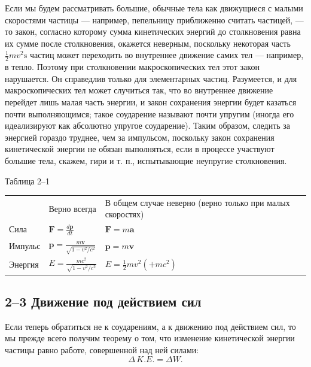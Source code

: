 \documentclass[11pt,oneside]{article}
\providecommand{\ddt}[2]{\frac{d#1}{d#2}}
\providecommand{\FLPF}{\mathbf{F}}
\providecommand{\FLPa}{\mathbf{a}}
\providecommand{\FLPp}{\mathbf{p}}
\providecommand{\FLPv}{\mathbf{v}}
\begin{document}
Если мы будем рассматривать большие, обычные тела как движущиеся с малыми скоростями частицы --- например, пепельницу приближенно считать частицей, --- то закон, согласно которому сумма кинетических энергий до столкновения равна их сумме после столкновения, окажется неверным, поскольку некоторая часть \(\frac12mv^2\text{s}\) частиц может переходить во внутреннее движение самих тел --- например, в тепло. Поэтому при столкновении макроскопических тел этот закон нарушается. Он справедлив только для элементарных частиц. Разумеется, и для макроскопических тел может случиться так, что во внутреннее движение перейдет лишь малая часть энергии, и закон сохранения энергии будет казаться почти выполняющимся; такое соударение называют почти упругим (иногда его идеализируют как абсолютно упругое соударение). Таким образом, следить за энергией гораздо труднее, чем за импульсом, поскольку закон сохранения кинетической энергии не обязан выполняться, если в процессе участвуют большие тела, скажем, гири и т. п., испытывающие неупругие столкновения.\par

\begin{center}
{\small Таблица 2--1}\par\smallskip
\begin{tabular}{lll}
 & Верно всегда & В общем случае неверно (верно только при малых скоростях)\\
Сила & \(\FLPF = \ddt{\FLPp}{t}\) & \(\FLPF = m\FLPa\)\\
Импульс & \(\FLPp = \frac{m\FLPv}{\sqrt{1-v^2/c^2}}\) & \(\FLPp = m\FLPv\)\\
Энергия & \(E = \frac{mc^2}{\sqrt{1-v^2/c^2}}\) & \(E = \frac12mv^2 (+mc^2)\)
\end{tabular}
\end{center}

\subsection*{2--3 Движение под действием сил}

Если теперь обратиться не к соударениям, а к движению под действием сил, то мы прежде всего получим теорему о том, что изменение кинетической энергии частицы равно работе, совершенной над ней силами: 
\begin{equation*} \tag{2.10}
\label{Eq:TIPS:2:10} \Delta\,K\!.\!E. = \Delta W. \end{equation*}
\par
\end{document}
